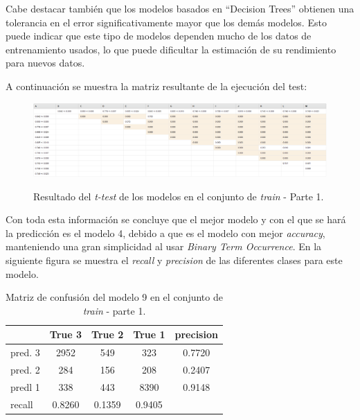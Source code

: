 \documentclass[es]{uc3mreport}
\begin{document}
\begin{report}
    Cabe destacar también que los modelos basados en ``Decision Trees'' obtienen
    una tolerancia en el error significativamente mayor que los demás modelos.
    Esto puede indicar que este tipo de modelos dependen mucho de los datos de
    entrenamiento usados, lo que puede dificultar la estimación de su rendimiento
    para nuevos datos.

    A continuación se muestra la matriz resultante de la ejecución del test:

    \begin{figure}[H]
        \center
        \includegraphics[width=\linewidth]{t_test1.jpeg}\\
        \caption{Resultado del \textit{t-test} de los modelos en el conjunto de
        \textit{train} - Parte 1.}
    \end{figure}

    Con toda esta información se concluye que el mejor modelo y con el que se hará
    la predicción es el modelo 4, debido a que es el modelo con mejor
    \textit{accuracy}, manteniendo una gran simplicidad al usar \textit{Binary Term
    Occurrence}. En la siguiente figura se muestra el \textit{recall} y
    \textit{precision} de las diferentes clases para este modelo.

\begin{table}
\begin{tabular}{@{}lccc|c@{}}
    \toprule
             & True 3 & True 2 & True 1 & precision\\
    \midrule
    pred. 3  & 2952   & 549    & 323    & 0.7720   \\
    pred. 2  & 284    & 156    & 208    & 0.2407   \\
    predl 1  & 338    & 443    & 8390   & 0.9148   \\
    \midrule
    recall   & 0.8260 & 0.1359 & 0.9405 &          \\
    \bottomrule
\end{tabular}
\caption{Matriz de confusión del modelo 9 en el conjunto de \textit{train} -
parte 1.}
\end{table}


\end{report}
\end{document}
